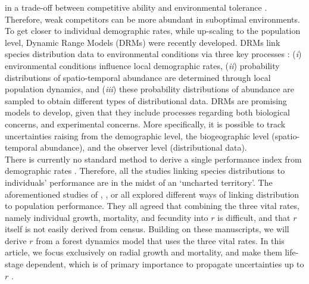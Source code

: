 in a trade-off between competitive ability and environmental tolerance
\citep{Serrano2015}. Therefore, weak competitors can be more abundant in
suboptimal environments.  To get closer to individual demographic rates,
while up-scaling to the population level, Dynamic Range Models (DRMs) were
recently developed. DRMs link species distribution data to environmental
conditions via three key processes \citep{Pagel2012}: (\textit{i})
environmental conditions influence local demographic rates, (\textit{ii})
probability distributions of spatio-temporal abundance are determined through local
population dynamics, and (\textit{iii}) these probability distributions of abundance are
sampled to obtain different types of distributional data. DRMs are promising
models to develop, given that they include processes regarding both biological
concerns, and experimental concerns. More specifically, it is possible to track uncertainties raising from the demographic level, the biogeographic level (spatio-temporal abundance), and the observer level (distributional data). \\

There is currently no standard method to derive a single performance index from demographic rates \citep{Purves2009}. Therefore, all the studies linking species distributions to individuals' performance are in the midst of an `uncharted territory'. The aforementioned studies of \citeauthor{McGill2012}, \citeauthor{Thuiller2014}, or \citeauthor{Pagel2012} all explored different ways of linking distribution to population performance. They all agreed that combining the three vital rates, namely individual growth, mortality, and fecundity into $ r $ is difficult, and that $ r $ itself is not easily derived from census. Building on these manuscripts, we will derive $ r $ from a forest dynamics model that uses the three vital rates. In this article, we focus exclusively on radial growth and mortality, and make them life-stage dependent, which is of primary importance to propagate uncertainties up to $ r $ \citep[$ \lambda $ in his article]{Clark2003b}. \\

